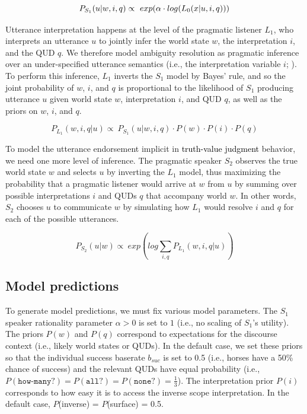 \documentclass[cm]{glossa}
\newcommand{\lp}[1]{\textcolor{black}{#1}} %
\begin{document}
\begin{equation*}
P_{S_{1}} (u | w, i, q) \propto  \ exp (\alpha \cdot log(L_{0}(x | u, i, q)))\\
\end{equation*}

Utterance interpretation happens at the level of the pragmatic listener $L_1$, who interprets an utterance $u$ to jointly infer the world state $w$, the interpretation $i$, and the QUD $q$. We therefore model ambiguity resolution as pragmatic inference over an under-specified utterance semantics (i.e., the interpretation variable $i$; \citealp{scontrasgoodman2017}). To perform this inference, $L_1$ inverts the $S_1$ model by Bayes' rule, and so the joint probability of $w$, $i$, and $q$ is proportional to the  likelihood of $S_1$ producing utterance $u$ given world state $w$, interpretation $i$, and QUD $q$, as well as the priors on $w$, $i$, and $q$.

\begin{equation*}
 P_{L_{1}} (w, i, q | u) \propto  \ P_{S_{1}} (u | w, i, q) \cdot P(w) \cdot P(i) \cdot P(q)
\end{equation*}

To model the utterance endorsement implicit in 
\lp{truth-value judgment}
behavior, we need one more level of inference. The pragmatic speaker $S_2$ observes the true world state $w$  and selects $u$ by inverting the $L_1$ model, thus maximizing the probability that a pragmatic listener would arrive at $w$ from $u$ by summing over possible interpretations $i$ and QUDs $q$ that accompany world $w$. In other words, $S_2$ chooses $u$ to communicate $w$ by simulating how $L_1$ would resolve $i$ and $q$ for each of the possible utterances.

\begin{equation*}
P_{S_{2}} (u | w) \propto \ exp(log \sum_{i,q} P_{L_{1}} (w, i, q | u))
\end{equation*}

\subsection{Model predictions}

To generate model predictions, we must fix various model parameters. The $S_1$ speaker rationality parameter $\alpha > 0$ is set to $1$ (i.e., no scaling of $S_1$'s utility). The priors $P(w)$ and $P(q)$ correspond to expectations for the discourse context (i.e., likely world states or QUDs). In  the  default  case,  we  set  these  priors  so that the individual success baserate $b_{suc}$ is set to 0.5 (i.e., horses have a 50\% chance of success) and the relevant QUDs have equal probability (i.e., $P(\texttt{how-many?}) = P(\texttt{all?}) = P(\texttt{none?}) = \frac{1}{3}$). The interpretation prior $P(i)$ corresponds to how easy it is to access the inverse scope interpretation. In the default case, $P$(inverse) = $P$(surface) = 0.5.
\end{document}
